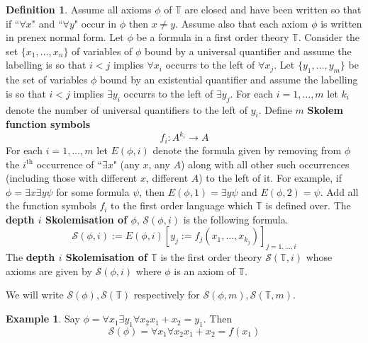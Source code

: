 \documentclass[12pt]{article}
\theoremstyle{plain}
\theoremstyle{definition}
\newtheorem{defn}[thm]{Definition} %
\newtheorem{example}[thm]{Example}
\newcommand{\bb}[1]{\mathbb{#1}}
\newcommand{\call}[1]{\mathcal{#1}}
\newcommand{\lto}{\longrightarrow}
\begin{document}
	\begin{defn}\label{def:skolemisation}
		Assume all axioms $\phi$ of $\bb{T}$ are closed and have been written so that if ``$\forall x$" and ``$\forall y$" occur in $\phi$ then $x \neq y$. Assume also that each axiom $\phi$ is written in prenex normal form. Let $\phi$ be a formula in a first order theory $\bb{T}$. Consider the set $\{ x_1,\ldots, x_n  \}$ of variables of $\phi$ bound by a universal quantifier and assume the labelling is so that $i < j$ implies $\forall x_i$ occurrs to the left of $\forall x_j$. Let $\{ y_1, \ldots, y_m \}$ be the set of variables $\phi$ bound by an existential quantifier and assume the labelling is so that $i < j$ implies $\exists y_i$ occurrs to the left of $\exists y_j$. For each $i = 1,\ldots, m$ let $k_i$ denote the number of universal quantifiers to the left of $y_i$. Define $m$ \textbf{Skolem function symbols}
		\begin{equation}
			f_{i}: A^{k_i} \lto A
			\end{equation}
		For each $i = 1, \ldots, m$ let $E(\phi, i)$ denote the formula given by removing from $\phi$ the $i^{\text{th}}$ occurrence of ``$\exists x$" (any $x$, any $A$) along with all other such occurrences (including those with different $x$, different $A$) to the left of it. For example, if $\phi = \exists x\exists y \psi$ for some formula $\psi$, then $E(\phi, 1) = \exists y \psi$ and $E(\phi, 2) = \psi$. Add all the function symbols $f_i$ to the first order language which $\bb{T}$ is defined over. The \textbf{depth $i$ Skolemisation of $\phi$}, $\call{S}(\phi, i)$ is the following formula.
		\begin{equation}
			\call{S}(\phi, i) := E(\phi, i)[y_j := f_j(x_1,\ldots, x_{k_j})]_{j = 1,\ldots, i}
			\end{equation}
		The \textbf{depth $i$ Skolemisation of $\bb{T}$} is the first order theory $\call{S}(\bb{T}, i)$ whose axioms are given by $\call{S}(\phi, i)$ where $\phi$ is an axiom of $\bb{T}$.
		
		We will write $\call{S}(\phi), \call{S}(\bb{T})$ respectively for $\call{S}(\phi, m), \call{S}(\bb{T}, m)$.
		\end{defn}
	
	\begin{example}
		Say $\phi = \forall x_1 \exists y_1 \forall x_2 x_1 + x_2 = y_1$. Then
		\begin{equation}\label{eq:skolem_example}
			\call{S}(\phi) = \forall x_1 \forall x_2 x_1 + x_2 = f(x_1)
			\end{equation}
		\end{example}
	
\end{document}
